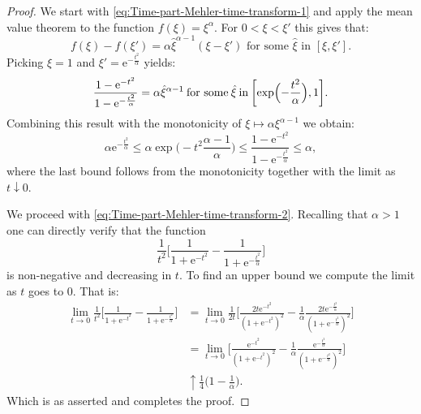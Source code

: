 \documentclass[a4paper,oneside,10pt]{amsproc}
\theoremstyle{plain}
\theoremstyle{remark}
\theoremstyle{definition}
\renewcommand{\leq}{\leqslant}
\renewcommand{\leq}{\leqslant}
\newcommand{\e}{\mathrm{e}} %
\renewcommand{\leq}{\leqslant}%
\begin{document}
\begin{proof}
  We start with \eqref{eq:Time-part-Mehler-time-transform-1} and apply
  the mean value theorem to the function $f(\xi) = \xi^\alpha$. For $0
  < \xi < \xi'$ this gives that:
  \begin{equation*}
    f(\xi) - f(\xi') = \alpha \hat{\xi}^{\alpha - 1} (\xi - \xi')
    \text{ for some $\hat \xi$ in $[\xi, \xi']$}.
  \end{equation*}
  Picking $\xi = 1$ and $\xi' = \e^{-\frac{t^2}{\alpha}}$ yields:
  \begin{equation}
    \label{eq:Time-part-Mehler-time-transform-proof-1}
    \frac{1 - \e^{-t^2}}{1 - \e^{-\frac{t^2}{\alpha}}} = \alpha
    \hat{\xi}^{\alpha - 1} \:\text{for some}\: \hat{\xi} \:\text{in}\:
    \biggl[\exp \Bigl(-\frac{t^2}{\alpha} \Bigr), 1 \biggr].
  \end{equation}
  Combining this result with the monotonicity of $\xi \mapsto
  \alpha \xi^{\alpha - 1}$ we obtain:
  \begin{equation*}
    \alpha \e^{-\frac{t^2}\alpha} \leq \alpha \exp\biggl(-t^2 \frac{\alpha -
      1}{\alpha} \biggr) \leq \frac{1 - \e^{-t^2}}{1 -
      \e^{-\frac{t^2}{\alpha}}} \leq \alpha,
  \end{equation*}
  where the last bound follows from the monotonicity together with the
  limit as $t \downarrow 0$.

  We proceed with \eqref{eq:Time-part-Mehler-time-transform-2}.
  Recalling that $\alpha > 1$ one can directly verify that the
  function
  \begin{equation*}
    \frac1{t^2} \biggl[\frac{1}{1 + \e^{-t^2}} - \frac{1}{1 +
      \e^{-\frac{t^2}{\alpha}}} \biggr]
  \end{equation*}
  is non-negative and decreasing in $t$. To find
  an upper bound we compute the limit as $t$ goes to $0$. That is:
  \begin{align*}
    \lim_{t \to 0} \frac1{t^2}\biggl[\frac{1}{1 +
      \e^{-t^2}} - \frac{1}{1 + \e^{-\frac{t^2}{\alpha}}} \biggr] 
    &= \lim_{t \to 0} \frac1{2t} \biggl[\frac{2t \e^{-t^2}}{(1 +
      \e^{-t^2})^2} - \frac1\alpha \frac{2t
      \e^{-\frac{t^2}{\alpha}}}{(1 + \e^{-\frac{t^2}{\alpha}})^2}
    \biggr]\\ 
    &= \lim_{t \to 0} \biggl[\frac{\e^{-t^2}}{(1 + \e^{-t^2})^2} -
    \frac1\alpha \frac{\e^{-\frac{t^2}{\alpha}}}{(1 +
      \e^{-\frac{t^2}{\alpha}})^2} \biggr]\\
    &\uparrow \frac{1}{4} \biggl(1 - \frac1\alpha \biggr).
  \end{align*}
  Which is as asserted and completes the proof.
\end{proof}
\end{document}
